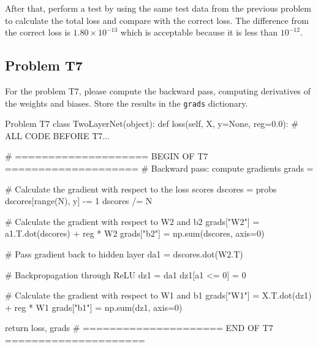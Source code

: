 \documentclass[12pt, a4paper]{article}
\begin{document}
            After that, perform a test by using the same test data from the previous problem to calculate the total loss and compare with the correct loss. The difference from the correct loss is $1.80 \times {10}^{-13}$ which is acceptable because it is less than ${10}^{-12}$.

    \pagebreak

        \subsection{Problem T7}
            For the problem T7, please compute the backward pass, computing derivatives of the weights and biases.
            Store the results in the \texttt{grads} dictionary.

            \begin{codeblock}{Problem T7}
                class TwoLayerNet(object):
                    def loss(self, X, y=None, reg=0.0):
                        # ALL CODE BEFORE T7...

                        # ==================== BEGIN OF T7 ====================
                        # Backward pass: compute gradients
                        grads = {}

                        # Calculate the gradient with respect to the loss scores
                        dscores = probs
                        dscores[range(N), y] -= 1
                        dscores /= N

                        # Calculate the gradient with respect to W2 and b2
                        grads["W2"] = a1.T.dot(dscores) + reg * W2
                        grads["b2"] = np.sum(dscores, axis=0)

                        # Pass gradient back to hidden layer
                        da1 = dscores.dot(W2.T)

                        # Backpropagation through ReLU
                        dz1 = da1
                        dz1[a1 <= 0] = 0

                        # Calculate the gradient with respect to W1 and b1
                        grads["W1"] = X.T.dot(dz1) + reg * W1
                        grads["b1"] = np.sum(dz1, axis=0)

                        return loss, grads
                        # ===================== END OF T7 =====================
            \end{codeblock}
\end{document}
